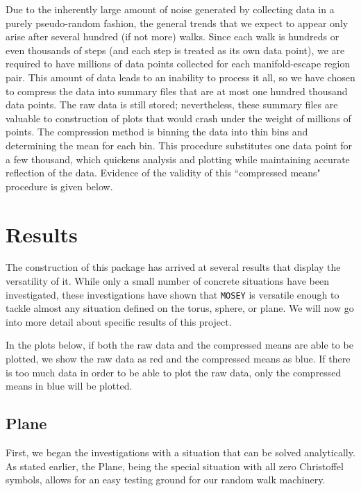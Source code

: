 \documentclass[12pt]{article}
\begin{document}
		Due to the inherently large amount of noise generated by collecting data in a purely pseudo-random fashion, the general trends that we expect to appear only arise after several hundred (if not more) walks.
		Since each walk is hundreds or even thousands of steps (and each step is treated as its own data point), we are required to have millions of data points collected for each manifold-escape region pair.
		This amount of data leads to an inability to process it all, so we have chosen to compress the data into summary files that are at most one hundred thousand data points.
		The raw data is still stored; nevertheless, these summary files are valuable to construction of plots that would crash under the weight of millions of points.
		The compression method is binning the data into thin bins and determining the mean for each bin.
		This procedure substitutes one data point for a few thousand, which quickens analysis and plotting while maintaining accurate reflection of the data.
		Evidence of the validity of this ``compressed means" procedure is given below.


\section{Results}
	The construction of this package has arrived at several results that display the versatility of it.
	While only a small number of concrete situations have been investigated, these investigations have shown that \texttt{MOSEY} is versatile enough to tackle almost any situation defined on the torus, sphere, or plane.
	We will now go into more detail about specific results of this project.
	
	In the plots below, if both the raw data and the compressed means are able to be plotted, we show the raw data as red and the compressed means as blue.
	If there is too much data in order to be able to plot the raw data, only the compressed means in blue will be plotted.
	
	\subsection{Plane}
		First, we began the investigations with a situation that can be solved analytically.
		As stated earlier, the Plane, being the special situation with all zero Christoffel symbols, allows for an easy testing ground for our random walk machinery.
		
\end{document}
